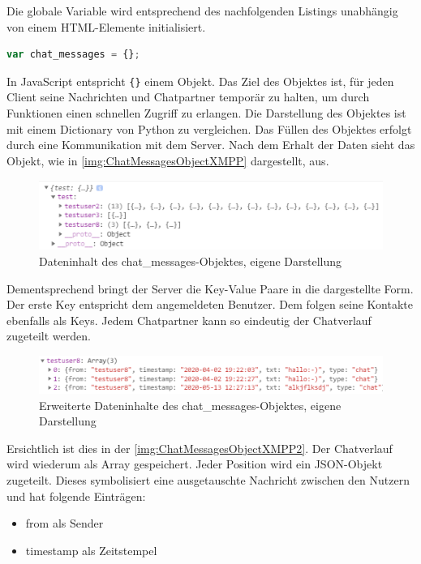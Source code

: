 \documentclass[a4paper,titlepage,halfparskip,12pt]{scrreprt}
\begin{document}
\begin{onehalfspacing}
Die globale Variable wird entsprechend des nachfolgenden Listings unabhängig von einem HTML-Elemente initialisiert.
\begin{lstlisting}[language=Javascript,caption=Initialisierung des chatmessages Objekt,label={lst:ChatMessagesObject}]
var chat_messages = {};
\end{lstlisting}
In JavaScript entspricht \texttt{\{\}} einem Objekt. Das Ziel des Objektes ist, für jeden Client seine Nachrichten und Chatpartner temporär zu halten, um durch Funktionen einen schnellen Zugriff zu erlangen. Die Darstellung des Objektes ist mit einem Dictionary von Python zu vergleichen. Das Füllen des Objektes erfolgt durch eine Kommunikation mit dem Server. Nach dem Erhalt der Daten sieht das Objekt, wie in \autoref{img:ChatMessagesObjectXMPP} dargestellt, aus.
\begin{figure}[h]
	\centering
	\includegraphics[width=\linewidth]{images/ChatMessagesObjectXMPP}
	\caption{Dateninhalt des chat\_messages-Objektes, eigene Darstellung}
	\label{img:ChatMessagesObjectXMPP}
\end{figure} 
Dementsprechend bringt der Server die Key-Value Paare in die dargestellte Form. Der erste Key entspricht dem angemeldeten Benutzer. Dem folgen seine Kontakte ebenfalls als Keys. Jedem Chatpartner kann so eindeutig der Chatverlauf zugeteilt werden.
\begin{figure}[h]
	\centering
	\includegraphics[width=\linewidth]{images/ChatMessagesObjectXMPP2}
	\caption{Erweiterte Dateninhalte des chat\_messages-Objektes, eigene Darstellung}
	\label{img:ChatMessagesObjectXMPP2}
\end{figure}
Ersichtlich ist dies in der \autoref{img:ChatMessagesObjectXMPP2}. Der Chatverlauf wird wiederum als Array gespeichert. Jeder Position wird ein JSON-Objekt zugeteilt. Dieses symbolisiert eine ausgetauschte Nachricht zwischen den Nutzern und hat folgende Einträgen:
\begin{itemize}
	\item from als Sender
	\item timestamp als Zeitstempel

\end{itemize}
\end{onehalfspacing}
\end{document}
